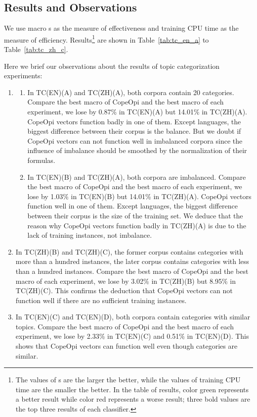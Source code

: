 \subsection{Results and Observations}
\par We use macro \fscore{}s as the measure of effectiveness and training CPU time as the measure of efficiency. Results\footnote{The values of \fscore{}s are the larger the better, while the values of training CPU time are the smaller the better. In the table of results, color green represents a better result while color red represents a worse result; three bold values are the top three results of each classifier.} are shown in Table~\ref{tab:tc_en_a} to Table~\ref{tab:tc_zh_c}.
\par Here we brief our observations about the results of topic categorization experiments:
\begin{enumerate}
\item
	\begin{enumerate}[label=(\roman*)]
	\item In TC(EN)(A) and TC(ZH)(A),
	both corpora contain 20 categories.
	Compare the best macro \fscore{} of CopeOpi and the best macro \fscore{} of each experiment, we lose by
	0.87\% in TC(EN)(A) but 14.01\% in TC(ZH)(A).
	CopeOpi vectors function badly in one of them.
	Except languages, the biggest difference between their corpus is the balance.
	But we doubt if CopeOpi vectors can not function well in imbalanced corpora since the influence of imbalance should be smoothed by the normalization of their formulas.
	\item In TC(EN)(B) and TC(ZH)(A),
	both corpora are imbalanced.
	Compare the best macro \fscore{} of CopeOpi and the best macro \fscore{} of each experiment, we lose by
	1.03\% in TC(EN)(B) but 14.01\% in TC(ZH)(A).
	CopeOpi vectors function well in one of them.
	Except languages, the biggest difference between their corpus is the size of the training set.
	We deduce that the reason why CopeOpi vectors function badly in TC(ZH)(A) is due to the lack of training instances, not imbalance.
	\end{enumerate}
\item In TC(ZH)(B) and TC(ZH)(C),
the former corpus contains categories with more than a hundred instances, the later corpus contains categories with less than a hundred instances.
Compare the best macro \fscore{} of CopeOpi and the best macro \fscore{} of each experiment, we lose by
3.02\% in TC(ZH)(B) but 8.95\% in TC(ZH)(C).
This confirms the deduction that CopeOpi vectors can not function well if there are no sufficient training instances. 
\item In TC(EN)(C) and TC(EN)(D),
both corpora contain categories with similar topics.
Compare the best macro \fscore{} of CopeOpi and the best macro \fscore{} of each experiment, we lose by
2.33\% in TC(EN)(C) and 0.51\% in TC(EN)(D).
This shows that CopeOpi vectors can function well even though categories are similar.
\end{enumerate}
